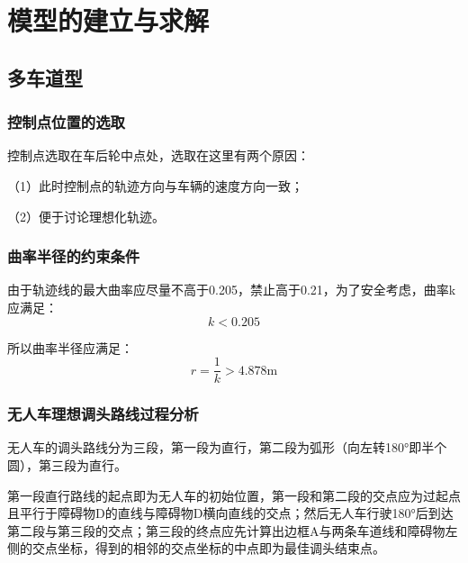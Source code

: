 \documentclass{article}
\begin{document}
\newpage                                                    %
\section{模型的建立与求解}
\subsection{多车道型}
\subsubsection{控制点位置的选取}
\noindent 控制点选取在车后轮中点处，选取在这里有两个原因：

\noindent（1）此时控制点的轨迹方向与车辆的速度方向一致；

\noindent（2）便于讨论理想化轨迹。

\subsubsection{曲率半径的约束条件}
由于轨迹线的最大曲率应尽量不高于0.205，禁止高于0.21，为了安全考虑，曲率k应满足：
\begin{equation}
    k < 0.205
\end{equation}      %

所以曲率半径应满足：
\begin{equation}
    r = \frac{1}{k} > 4.878 \mathrm{m}
\end{equation}

\subsubsection{无人车理想调头路线过程分析}
无人车的调头路线分为三段，第一段为直行，第二段为弧形（向左转180°即半个圆），第三段为直行。

第一段直行路线的起点即为无人车的初始位置，第一段和第二段的交点应为过起点且平行于障碍物D的直线与障碍物D横向直线的交点；然后无人车行驶180°后到达第二段与第三段的交点；第三段的终点应先计算出边框A与两条车道线和障碍物左侧的交点坐标，得到的相邻的交点坐标的中点即为最佳调头结束点。
\end{document}
